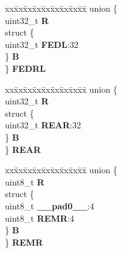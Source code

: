 \begin{DoxyCompactItemize}
\begin{tabbing}
\end{tabbing}\item 
\mbox{\label{structECSM__tag_a58639ddbd2a59a271d74fa3cb2a8ebb3}} 
\begin{tabbing}
xx\=xx\=xx\=xx\=xx\=xx\=xx\=xx\=xx\=\kill
union \{\\
\>uint32\_t {\bfseries R}\\
\>struct \{\\
\>\>uint32\_t {\bfseries FEDL}:32\\
\>\} {\bfseries B}\\
\} {\bfseries FEDRL}\\

\end{tabbing}\item 
\mbox{\label{structECSM__tag_aeacc1c89c1c29b12bd2be9679830a849}} 
\begin{tabbing}
xx\=xx\=xx\=xx\=xx\=xx\=xx\=xx\=xx\=\kill
union \{\\
\>uint32\_t {\bfseries R}\\
\>struct \{\\
\>\>uint32\_t {\bfseries REAR}:32\\
\>\} {\bfseries B}\\
\} {\bfseries REAR}\\

\end{tabbing}\item 
\mbox{\label{structECSM__tag_ac2f0966321f5ce343cd6be34595b034f}} 
\begin{tabbing}
xx\=xx\=xx\=xx\=xx\=xx\=xx\=xx\=xx\=\kill
union \{\\
\>uint8\_t {\bfseries R}\\
\>struct \{\\
\>\>uint8\_t {\bfseries \_\_pad0\_\_}:4\\
\>\>uint8\_t {\bfseries REMR}:4\\
\>\} {\bfseries B}\\
\} {\bfseries REMR}\\


\end{tabbing}
\end{DoxyCompactItemize}
